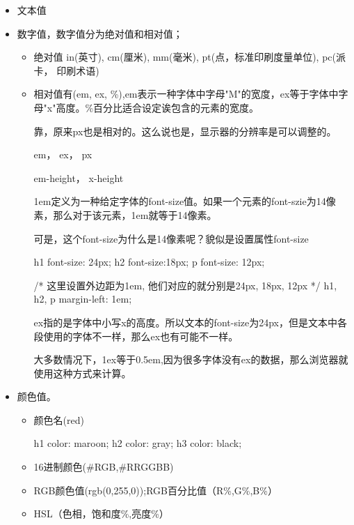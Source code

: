 \begin{itemize}
\item 文本值
\item 数字值，数字值分为绝对值和相对值；

\begin{itemize}
\item 绝对值 in(英寸), cm(厘米), mm(毫米), pt(点，标准印刷度量单位), pc(派卡， 印刷术语)



\item 相对值有(em, ex, \%),em表示一种字体中字母"M"的宽度，ex等于字体中字母"x"高度。\%百分比适合设定诶包含的元素的宽度。

靠，原来px也是相对的。这么说也是，显示器的分辨率是可以调整的。


em， ex， px

em-height， x-height

1em定义为一种给定字体的font-size值。如果一个元素的font-szie为14像素，那么对于该元素，1em就等于14像素。

可是，这个font-size为什么是14像素呢？貌似是设置属性font-size

\begin{CSS}

h1 { font-size: 24px; }
h2 { font-size:18px; }
p  { font-size: 12px; }

/* 这里设置外边距为1em, 他们对应的就分别是24px, 18px, 12px */
h1, h2, p { margin-left: 1em; }


\end{CSS}

ex指的是字体中小写x的高度。所以文本的font-size为24px，但是文本中各段使用的字体不一样，那么ex也有可能不一样。

大多数情况下，1ex等于0.5em,因为很多字体没有ex的数据，那么浏览器就使用这种方式来计算。



\end{itemize}
\item 颜色值。
\begin{itemize}
\item 颜色名(red)
\begin{CSS}
h1 {color: maroon;}
h2 {color: gray;}
h3 {color: black;}
\end{CSS}
\item 16进制颜色(\#RGB,\#RRGGBB)
\item RGB颜色值(rgb(0,255,0));RGB百分比值（R\%,G\%,B\%）
\item HSL（色相，饱和度\%,亮度\%）
\end{itemize}

\end{itemize}

